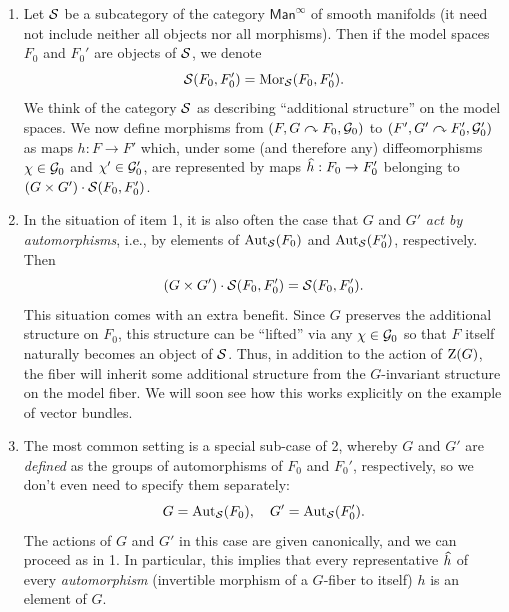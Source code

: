 \begin{enumerate}
    \item Let $\mathcal{S}$ be a subcategory of the category $\mathsf{Man}^\infty$ of smooth manifolds (it need not include neither all objects nor all morphisms). Then if the model spaces $F_0$ and $F_0'$ are objects of $\mathcal{S}$, we denote
    \[\mathcal{S}(F_0,F_0')=\operatorname{Mor}_{\mathcal{S}}(F_0,F_0').\]
    We think of the category $\mathcal{S}$ as describing ``additional structure'' on the model spaces. We now define morphisms from $(F,G\curvearrowright F_0,\mathcal{G}_0)$ to $(F',G'\curvearrowright F_0',\mathcal{G}_0')$ as maps $h:F\to F'$ which, under some (and therefore any) diffeomorphisms $\chi\in\mathcal{G}_0$ and $\chi'\in\mathcal{G}_0'$, are represented by maps $\wh{h}:F_0\to F_0'$ belonging to $(G\times G')\cdot \mathcal{S}(F_0,F_0')$.
    
    \item In the situation of item 1, it is also often the case that $G$ and $G'$ \emph{act by automorphisms}, i.e., by elements of $\operatorname{Aut}_{\mathcal{S}}(F_0)$ and $\operatorname{Aut}_{\mathcal{S}}(F_0')$, respectively. Then 
    \[(G\times G')\cdot \mathcal{S}(F_0,F_0')=\mathcal{S}(F_0,F_0').\]
    This situation comes with an extra benefit. Since $G$ preserves the additional structure on $F_0$, this structure can be ``lifted'' via any $\chi\in \mathcal{G}_0$ so that $F$ itself naturally becomes an object of $\mathcal{S}$. Thus, in addition to the action of $\mathrm{Z}(G)$, the fiber will inherit some additional structure from the $G$-invariant structure on the model fiber. We will soon see how this works explicitly on the example of vector bundles.
    \item The most common setting is a special sub-case of 2, whereby $G$ and $G'$ are \emph{defined} as the groups of automorphisms of $F_0$ and $F_0'$, respectively, so we don't even need to specify them separately:
    \[G=\operatorname{Aut}_{\mathcal{S}}(F_0),\quad G'=\operatorname{Aut}_{\mathcal{S}}(F_0').\]
    The actions of $G$ and $G'$ in this case are given canonically, and we can proceed as in 1. In particular, this implies that every representative $\wh{h}$ of every \emph{automorphism} (invertible morphism of a $G$-fiber to itself) $h$ is an element of $G$.
\end{enumerate}

